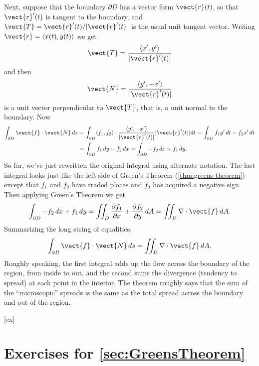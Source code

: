 Next, suppose that the boundary $\partial D$ has a vector form
$\vect{r}(t)$, so that $\vect{r}'(t)$ is tangent to the boundary, and
$\vect{T}=\vect{r}'(t)/|\vect{r}'(t)|$ is the usual unit tangent vector.
Writing $\vect{r}=\langle x(t),y(t)\rangle$ we get
$$\vect{T}={\langle x',y'\rangle\over|\vect{r}'(t)|}$$
and then
$$\vect{N}={\langle y',-x'\rangle\over|\vect{r}'(t)|}$$
is a unit vector perpendicular to $\vect{T}$, that is, a unit normal to
the boundary. 
Now
\begin{align*}
\int_{\partial D} \vect{f}\cdot\vect{N}\,ds&=
\int_{\partial D} \langle f_1, f_2\rangle\cdot{\langle
  y',-x'\rangle\over|\vect{r}'(t)|} |\vect{r}'(t)|dt=
\int_{\partial D} f_1 y'\,dt - f_2 x'\,dt	\\
&=\int_{\partial D} f_1 \,dy - f_2 \,dx
=\int_{\partial D} - f_2 \,dx+ f_1\,dy.
\end{align*}
So far, we've just rewritten the original integral using alternate
notation. The last integral looks just like the left side of Green's
Theorem (\ref{thm:greens theorem}) except that $f_1$ and $f_2$ have
traded places and $f_2$ has acquired a negative sign. Then applying
Green's Theorem we get 
$$
\int_{\partial D} - f_2\,dx+f_1\,dy=\iint_{D} {\partial f_1\over\partial x}+{\partial f_2\over\partial y}\,dA=
\iint_{D} \nabla\cdot\vect{f}\,dA.$$
Summarizing the long string of equalities, 
\begin{equation}\label{eq:greens theorem third form}
\int_{\partial D} \vect{f}\cdot\vect{N}\,ds=\iint_{D} \nabla\cdot\vect{f}\,dA.
\end{equation}
Roughly speaking, the first integral adds up the flow across the
boundary of the region, from inside to out, and the second sums the
divergence (tendency to spread) at each point in the interior. The
theorem roughly says that the sum of the ``microscopic'' spreads is
the same as the total spread across the boundary and out of the region.




[ex]
\section*{Exercises for \ref{sec:GreensTheorem}}

